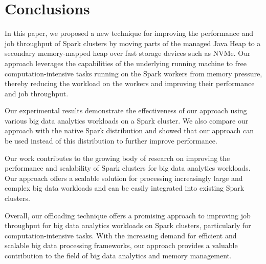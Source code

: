 \section{Conclusions}

In this paper, we proposed a new technique for improving the
performance and job throughput of Spark clusters by moving parts of
the managed Java Heap to a secondary memory-mapped heap over fast
storage devices such as NVMe. Our approach leverages the capabilities
of the underlying running machine to free computation-intensive tasks
running on the Spark workers from memory pressure, thereby reducing
the workload on the workers and improving their performance and job
throughput.

Our experimental results demonstrate the effectiveness of our approach
using various big data analytics workloads on a Spark cluster. We also
compare our approach with the native Spark distribution and showed
that our approach can be used instead of this distribution to further
improve performance.

Our work contributes to the growing body of research on improving the
performance and scalability of Spark clusters for big data analytics
workloads. Our approach offers a scalable solution for processing
increasingly large and complex big data workloads and can be easily
integrated into existing Spark clusters.

Overall, our offloading technique offers a promising approach to
improving job throughput for big data analytics workloads on Spark
clusters, particularly for computation-intensive tasks. With the
increasing demand for efficient and scalable big data processing
frameworks, our approach provides a valuable contribution to the field
of big data analytics and memory management.
